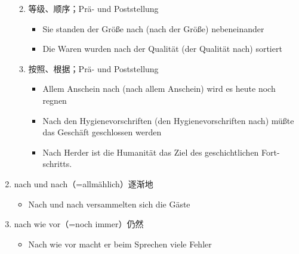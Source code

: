 \documentclass[UTF8]{report}
\begin{document}
\begin{enumerate}
\begin{enumerate}
\begin{itemize}
        \end{itemize}
        \item 等级、顺序；Prä- und Poststellung
        \begin{itemize}
            \item Sie standen der Größe nach (nach der Größe) nebeneinander
            \item Die Waren wurden nach der Qualität (der Qualität nach) sortiert
        \end{itemize}
        \item 按照、根据；Prä- und Poststellung
        \begin{itemize}
            \item Allem Anschein nach (nach allem Anschein) wird es heute noch regnen
            \item Nach den Hygienevorschriften (den Hygienevorschriften nach) müßte das Geschäft geschlossen werden
            \item Nach Herder ist die Humanität das Ziel des geschichtlichen Fort- schritts.
        \end{itemize}
    \end{enumerate}
    \item nach und nach（=allmählich）逐渐地
    \begin{itemize}
        \item Nach und nach versammelten sich die Gäste
    \end{itemize}
    \item nach wie vor（=noch immer）仍然
    \begin{itemize}
        \item Nach wie vor macht er beim Sprechen viele Fehler
    \end{itemize}
\end{enumerate}
\end{document}
